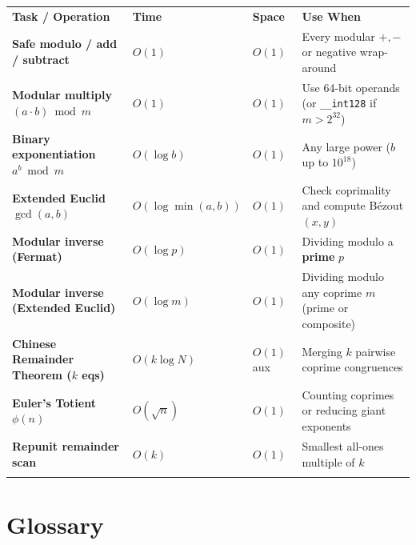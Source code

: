 \documentclass[11pt,a4paper]{article}
\theoremstyle{definition}
\begin{document}
\begingroup\small{}
\begin{tabularx}{\textwidth}{>{\raggedright\arraybackslash\bfseries}p{4.3cm} >{\centering\arraybackslash}p{2.4cm} >{\centering\arraybackslash}p{1.4cm} >{\raggedright\arraybackslash}X}
\arrayrulecolor{primaryblue}\toprule[1.2pt]
\rowcolor{primaryblue!10}
\textcolor{primaryblue}{\textbf{Task / Operation}} & \textcolor{primaryblue}{\textbf{Time}} & \textcolor{primaryblue}{\textbf{Space}} & \textcolor{primaryblue}{\textbf{Use When}} \\
\arrayrulecolor{codeframe}\midrule[0.6pt]
Safe modulo / add / subtract & $O(1)$ & $O(1)$ & Every modular $+, -$ or negative wrap-around \\
Modular multiply $(a \cdot b) \bmod m$ & $O(1)$ & $O(1)$ & Use 64-bit operands (or \texttt{\_\_int128} if $m > 2^{32}$) \\
Binary exponentiation $a^b \bmod m$ & $O(\log b)$ & $O(1)$ & Any large power ($b$ up to $10^{18}$) \\
Extended Euclid $\gcd(a, b)$ & $O(\log \min(a,b))$ & $O(1)$ & Check coprimality and compute B\'{e}zout $(x, y)$ \\
Modular inverse (Fermat) & $O(\log p)$ & $O(1)$ & Dividing modulo a \textbf{prime} $p$ \\
Modular inverse (Extended Euclid) & $O(\log m)$ & $O(1)$ & Dividing modulo any coprime $m$ (prime or composite) \\
Chinese Remainder Theorem ($k$ eqs) & $O(k \log N)$ & $O(1)$ aux & Merging $k$ pairwise coprime congruences \\
Euler's Totient $\phi(n)$ & $O(\sqrt{n})$ & $O(1)$ & Counting coprimes or reducing giant exponents \\
Repunit remainder scan & $O(k)$ & $O(1)$ & Smallest all-ones multiple of $k$ \\
\arrayrulecolor{primaryblue}\bottomrule[1.2pt]
\end{tabularx}\endgroup

\section{Glossary}
\end{document}
